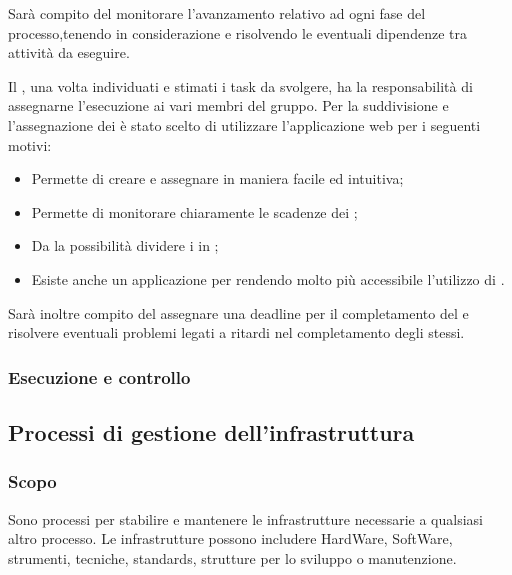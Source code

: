 \documentclass[12pt,a4paper]{article}
\begin{document}
Sarà compito del \PM{} monitorare l'avanzamento relativo ad ogni fase del processo,tenendo in considerazione e risolvendo le eventuali dipendenze tra attività da eseguire.

Il \PM{}, una volta individuati e stimati i task da svolgere, ha la responsabilità di assegnarne l'esecuzione ai vari membri del gruppo.
Per la suddivisione e l'assegnazione dei \textit{} è stato scelto di utilizzare l'applicazione web \textit{} per i seguenti motivi:
 \begin{itemize}
  \item Permette di creare e assegnare \textit{} in maniera facile ed intuitiva;
  \item Permette di monitorare chiaramente le scadenze dei \textit{};
  \item Da la possibilità dividere i \textit{} in \textit{};
  \item Esiste anche un applicazione per \textit{} rendendo molto più accessibile l'utilizzo di  \textit{}.
\end{itemize}
Sarà inoltre compito del \PM{} assegnare una deadline per il completamento del \textit{} e risolvere eventuali problemi legati a ritardi nel completamento degli stessi.

\subsubsection{Esecuzione e controllo} %

\newpage

\subsection{Processi di gestione dell'infrastruttura} %
\subsubsection{Scopo} 
Sono processi per stabilire e mantenere le infrastrutture necessarie a qualsiasi altro processo. Le infrastrutture  possono includere HardWare, SoftWare, strumenti, tecniche, standards, strutture per lo sviluppo o manutenzione.
\end{document}
